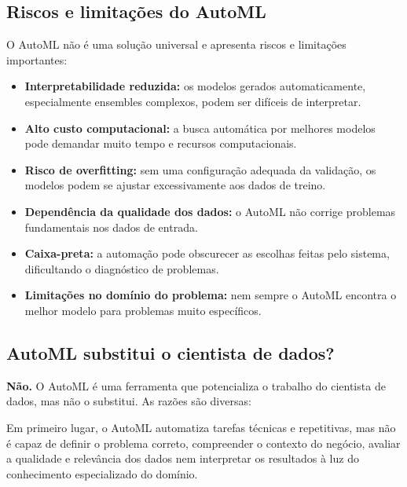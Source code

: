 \documentclass[11pt, a4paper, oneside]{article}
\begin{document}
\subsection{Riscos e limitações do AutoML}
\label{sec:riscos}

O AutoML não é uma solução universal e apresenta riscos e limitações importantes:

\begin{itemize}[leftmargin=1.5cm, itemsep=4pt]
  \item \textbf{Interpretabilidade reduzida:} os modelos gerados automaticamente, especialmente ensembles complexos, podem ser difíceis de interpretar.
  \item \textbf{Alto custo computacional:} a busca automática por melhores modelos pode demandar muito tempo e recursos computacionais.
  \item \textbf{Risco de overfitting:} sem uma configuração adequada da validação, os modelos podem se ajustar excessivamente aos dados de treino.
  \item \textbf{Dependência da qualidade dos dados:} o AutoML não corrige problemas fundamentais nos dados de entrada.
  \item \textbf{Caixa-preta:} a automação pode obscurecer as escolhas feitas pelo sistema, dificultando o diagnóstico de problemas.
  \item \textbf{Limitações no domínio do problema:} nem sempre o AutoML encontra o melhor modelo para problemas muito específicos.
\end{itemize}

\subsection{AutoML substitui o cientista de dados?}
\label{sec:substitui}

\textbf{Não.} O AutoML é uma ferramenta que potencializa o trabalho do cientista de
dados, mas não o substitui. As razões são diversas:

Em primeiro lugar, o AutoML automatiza tarefas técnicas e repetitivas, mas não é
capaz de definir o problema correto, compreender o contexto do negócio, avaliar a
qualidade e relevância dos dados nem interpretar os resultados à luz do conhecimento
especializado do domínio.
\end{document}
